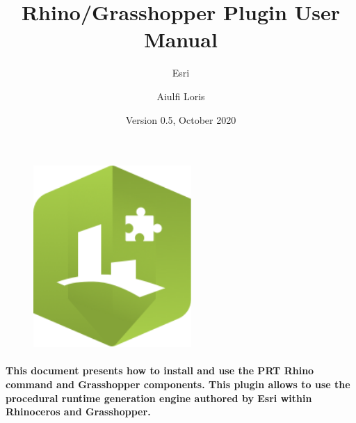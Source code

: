 \documentclass{article}
\title{Rhino/Grasshopper Plugin User Manual}
\subtitle{Esri}
\author{Aiulfi Loris}
\date{Version 0.5, October 2020}
\begin{document}
\begin{figure}
    \centering
    \includegraphics[width=60mm]{res/rhino_plugin_base_icon.png}
\end{figure}

\maketitle

\paragraph{This document presents how to install and use the PRT Rhino command and Grasshopper components. This plugin allows to use the procedural runtime generation engine authored by Esri within Rhinoceros and Grasshopper.}

\tableofcontents





\end{document}
